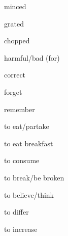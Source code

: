 \documentclass[avery5371,grid,frame]{flashcards}
\begin{document}
\begin{flashcard}{\LARGE minced}
\LARGE {}
\end{flashcard}
\begin{flashcard}{\LARGE grated}
\LARGE {}
\end{flashcard}
\begin{flashcard}{\LARGE chopped}
\LARGE {}
\end{flashcard}
\begin{flashcard}{\LARGE harmful/bad (for)}
\LARGE {}
\end{flashcard}
\begin{flashcard}{\LARGE correct}
\LARGE {}
\end{flashcard}
\begin{flashcard}{\LARGE forget}
\LARGE {}
\end{flashcard}
\begin{flashcard}{\LARGE remember}
\LARGE {}
\end{flashcard}
\begin{flashcard}{\LARGE to eat/partake}
\LARGE {}
\end{flashcard}
\begin{flashcard}{\LARGE to eat breakfast}
\LARGE {}
\end{flashcard}
\begin{flashcard}{\LARGE to consume}
\LARGE {}
\end{flashcard}
\begin{flashcard}{\LARGE to break/be broken}
\LARGE {}
\end{flashcard}
\begin{flashcard}{\LARGE to believe/think}
\LARGE {}
\end{flashcard}
\begin{flashcard}{\LARGE to differ}
\LARGE {}
\end{flashcard}
\begin{flashcard}{\LARGE to increase}
\LARGE {}
\end{flashcard}
\end{document}
